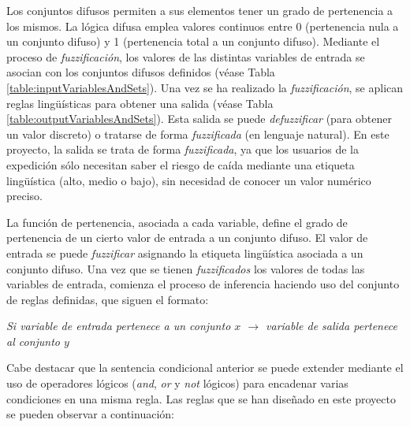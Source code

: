 Los conjuntos difusos permiten a sus elementos tener un grado de pertenencia a los mismos. La lógica difusa emplea valores continuos entre 0 (pertenencia nula a un conjunto difuso) y 1 (pertenencia total a un conjunto difuso). Mediante el proceso de \textit{fuzzificación}, los valores de las distintas variables de entrada se asocian con los conjuntos difusos definidos (véase Tabla \ref{table:inputVariablesAndSets}). Una vez se ha realizado la \textit{fuzzificación}, se aplican reglas lingüísticas para obtener una salida (véase Tabla \ref{table:outputVariablesAndSets}). Esta salida se puede \textit{defuzzificar} (para obtener un valor discreto) o tratarse de forma \textit{fuzzificada} (en lenguaje natural). En este proyecto, la salida se trata de forma \textit{fuzzificada}, ya que los usuarios de la expedición sólo necesitan saber el riesgo de caída mediante una etiqueta lingüística (alto, medio o bajo), sin necesidad de conocer un valor numérico preciso.

La función de pertenencia, asociada a cada variable, define el grado de pertenencia de un cierto valor de entrada a un conjunto difuso. El valor de entrada se puede \textit{fuzzificar} asignando la etiqueta lingüística asociada a un conjunto difuso. Una vez que se tienen \textit{fuzzificados} los valores de todas las variables de entrada, comienza el proceso de inferencia haciendo uso del conjunto de reglas definidas, que siguen el formato:

\textit{Si variable de entrada pertenece a un conjunto $x$ $\rightarrow$ variable de salida pertenece al conjunto $y$}

Cabe destacar que la sentencia condicional anterior se puede extender mediante el uso de operadores lógicos (\textit{and}, \textit{or} y \textit{not} lógicos) para encadenar varias condiciones en una misma regla. Las reglas que se han diseñado en este proyecto se pueden observar a continuación: 

